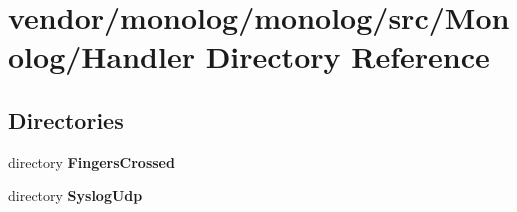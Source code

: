 \section{vendor/monolog/monolog/src/\+Monolog/\+Handler Directory Reference}
\label{dir_71f341e6da37cd2ebda841d0cde1ea1b}
\subsection*{Directories}
\begin{DoxyCompactItemize}
\item 
directory {\bf Fingers\+Crossed}
\item 
directory {\bf Syslog\+Udp}
\end{DoxyCompactItemize}
